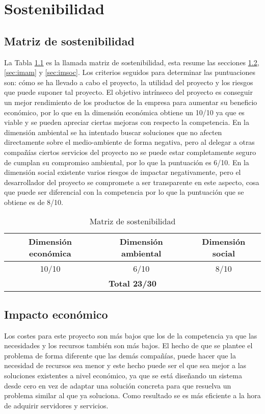 \chapter{Sostenibilidad}

\section{Matriz de sostenibilidad}
La Tabla \ref{tab:matsos} es la llamada matriz de sostenibilidad, esta resume las secciones \ref{sec:imec}, \ref{sec:imam} y \ref{sec:imsoc}. Los criterios seguidos para determinar las puntuaciones son: cómo se ha llevado a cabo el proyecto, la utilidad del proyecto y los riesgos que puede suponer tal proyecto.
El objetivo intrínseco del proyecto es conseguir un mejor rendimiento de los productos de la empresa para aumentar su beneficio económico, por lo que en la dimensión económica obtiene un 10/10 ya que es viable y se pueden apreciar ciertas mejoras con respecto la competencia. En la dimensión ambiental se ha intentado buscar soluciones que no afecten directamente sobre el medio-ambiente de forma negativa, pero al delegar a otras compañías ciertos servicios del proyecto no se puede estar completamente seguro de cumplan su compromiso ambiental, por lo que la puntuación es 6/10. En la dimensión social existente varios riesgos de impactar negativamente, pero el desarrollador del proyecto se compromete a ser transparente en este aspecto, cosa que puede ser diferencial con la competencia por lo que la puntuación que se obtiene es de 8/10.

\begin{table}[H]\label{tab:matsos}
	\centering
	\begin{tabular}{|c|c|c|}
		\hline
		\textbf{Dimensión económica} & \textbf{Dimensión ambiental} & \textbf{Dimensión social}  \\ \hline
		10/10                 &        6/10                  &       8/10                 \\ \hline
		\multicolumn{3}{|c|}{\textbf{Total 23/30}} \\ \hline
	\end{tabular} 
	\caption{Matriz de sostenibilidad}
\end{table}

\section{Impacto económico}\label{sec:imec}
 
Los costes para este proyecto son más bajos que los de la competencia ya que las necesidades y los recursos también son más bajos. El hecho de que se plantee el problema de forma diferente que las demás compañías, puede hacer que la necesidad de recursos sea menor y este hecho puede ser el que sea mejor a las soluciones existentes a nivel económico, ya que se está diseñando un sistema desde cero en vez de adaptar una solución concreta para que resuelva un problema similar al que ya soluciona. Como resultado se es más eficiente a la hora de adquirir servidores y servicios.

